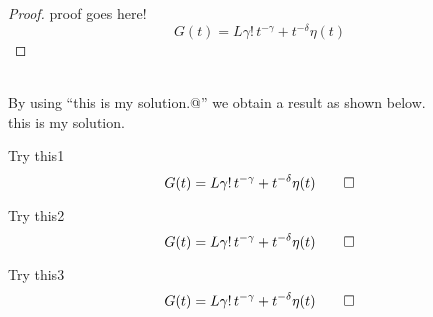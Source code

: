 %
%
\begin{proof}
proof goes here!
\begin{equation}
G(t)=L\gamma!\,t^{-\gamma}+t^{-\delta}\eta(t) %
\end{equation}
\end{proof}
%
%
\par \raggedright{}\\
By using ``\verb@\SOL this is my solution.@'' we obtain a result as shown below.\\[6pt]
\SOL this is my solution.\\

%
%
%
\begin{theorem}
Try this1
\begin{equation}
G(t)=L\gamma!\,t^{-\gamma}+t^{-\delta}\eta(t) \qedhere
\end{equation}
\end{theorem}
%
%
\begin{question} \setcounter{equation}{0}
Try this2
\begin{equation}
G(t)=L\gamma!\,t^{-\gamma}+t^{-\delta}\eta(t) \qedhere
\end{equation}
\end{question}
%
%
\begin{question} \setcounter{equation}{0}
Try this3
\begin{equation}
G(t)=L\gamma!\,t^{-\gamma}+t^{-\delta}\eta(t) \qedhere
\end{equation}
\end{question}
%
%
%
%
\\
\vspace{8pt}
\\ 
%
%
%
\begin{center}\end{center}

